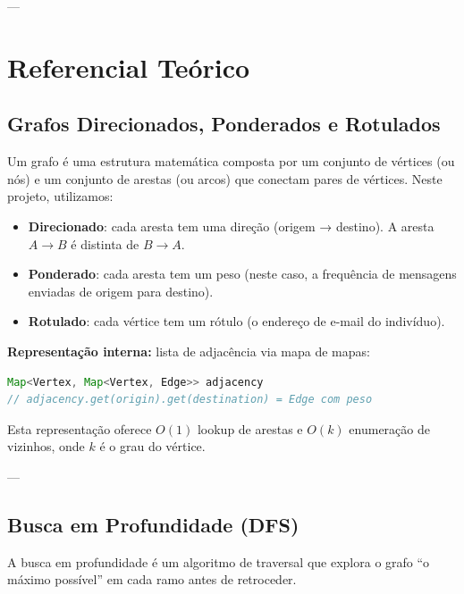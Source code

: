 \documentclass[12pt,openright,twoside,a4paper,english,brazilian,hidelinks]{abntex2}
\begin{document}
    ---


    \chapter{Referencial Teórico}

    \section{Grafos Direcionados, Ponderados e Rotulados}

    Um grafo é uma estrutura matemática composta por um conjunto de vértices (ou nós) e um
    conjunto de arestas (ou arcos) que conectam pares de vértices. Neste projeto, utilizamos:

    \begin{itemize}
        \item \textbf{Direcionado}: cada aresta tem uma direção (origem → destino). A aresta
        $A \to B$ é distinta de $B \to A$.
        \item \textbf{Ponderado}: cada aresta tem um peso (neste caso, a frequência de
        mensagens enviadas de origem para destino).
        \item \textbf{Rotulado}: cada vértice tem um rótulo (o endereço de e-mail do indivíduo).
    \end{itemize}

    \textbf{Representação interna:} lista de adjacência via mapa de mapas:

    \begin{lstlisting}[language=Java]
Map<Vertex, Map<Vertex, Edge>> adjacency
// adjacency.get(origin).get(destination) = Edge com peso
    \end{lstlisting}

    Esta representação oferece $O(1)$ lookup de arestas e $O(k)$ enumeração de vizinhos,
    onde $k$ é o grau do vértice.

    ---

    \section{Busca em Profundidade (DFS)}

    A busca em profundidade é um algoritmo de traversal que explora o grafo ``o máximo
    possível'' em cada ramo antes de retroceder.
\end{document}
